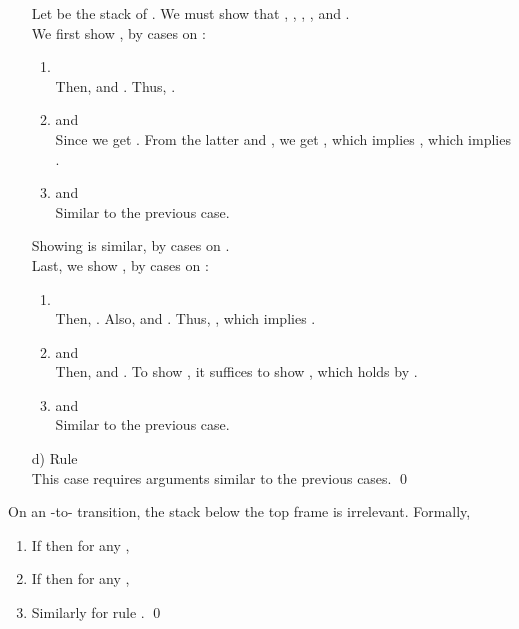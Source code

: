 \documentclass{LMCS}
\theoremstyle{definition} \newtheorem{property}[thm]{Property}
\begin{document}
\begin{enumerate}[]
    \rule{0cm}{0.6cm}\\
     \\
     \\
     \\
    \\ 
    Let  be the stack of .
    We must show that , \ie,
    , , 
    and . \\
    We first show , by cases on :
    \begin{enumerate}[]
    \item 
       \\
      Then,  and .
      Thus, .
    \item
       and  \\
      Since  we get .
      From the latter and , we get , which implies , which implies .
    \item
       and  \\
      Similar to the previous case.
    \end{enumerate}
    Showing  is similar, by cases on . \\
    Last, we show , by cases on :
    \begin{enumerate}[]
    \item 
       \\
      Then, .
      Also,  and
      .
      Thus, , which implies .
    \item
       and  \\
      Then,  and .
      To show , it suffices to show , which holds by .
    \item
       and  \\
      Similar to the previous case.
    \end{enumerate}
    
\item[d)]
    Rule  \\ 
    This case requires arguments similar to the previous cases.
    \qed
\end{enumerate}

\begin{lem} \label{lem:stack-eval}
  On an \daeval{}-to-\daapply{} transition, the stack below the top frame is 
  irrelevant. 
  Formally,
  \begin{enumerate}[]
  \item 
    If  then for any , \\
    
  \item
    If 
    then for any , \\
    
  \item
    Similarly for rule .
    \qed
  \end{enumerate}
\end{lem}
\end{document}
